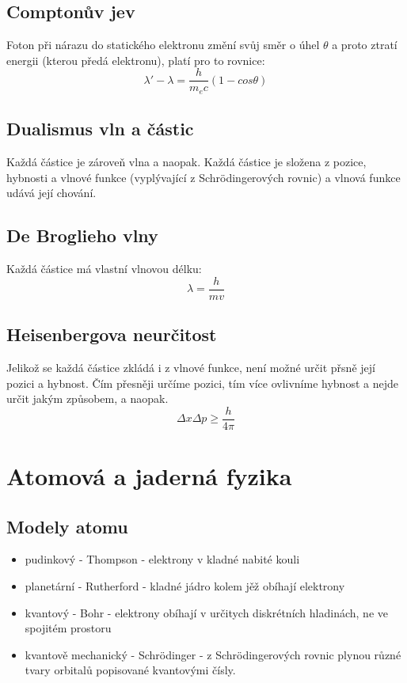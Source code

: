 \documentclass[titlepage]{report}
\begin{document}
\section{Comptonův jev}
Foton při nárazu do statického elektronu změní svůj směr o úhel $\theta$ a proto ztratí energii (kterou předá elektronu), platí pro to rovnice:\\
\begin{equation}
\lambda' - \lambda = \frac{h}{m_ec} (1 - cos \theta)
\end{equation}
\section{Dualismus vln a částic}
Každá částice je zároveň vlna a naopak. Každá částice je složena z pozice, hybnosti a vlnové funkce (vyplývající z Schrödingerových rovnic) a vlnová funkce udává její chování.
\section{De Broglieho vlny}
Každá částice má vlastní vlnovou délku:\\
\begin{equation}
\lambda = \frac{h}{mv}
\end{equation}
\section{Heisenbergova neurčitost}
Jelikož se každá částice zkládá i z vlnové funkce, není možné určit přsně její pozici a hybnost. Čím přesněji určíme pozici, tím více ovlivníme hybnost a nejde určit jakým způsobem, a naopak.
\begin{equation}
\Delta x \Delta p \geq \frac{h}{4 \pi}
\end{equation}
\chapter{Atomová a jaderná fyzika}
\section{Modely atomu}
\begin{itemize}
\item pudinkový - Thompson - elektrony v kladné nabité kouli
\item planetární - Rutherford - kladné jádro kolem jěž obíhají elektrony
\item kvantový - Bohr - elektrony obíhají v určitych diskrétních hladinách, ne ve spojitém prostoru
\item kvantově mechanický - Schrödinger - z Schrödingerových rovnic plynou různé tvary orbitalů popisované kvantovými čísly.
\end{itemize}
\end{document}
